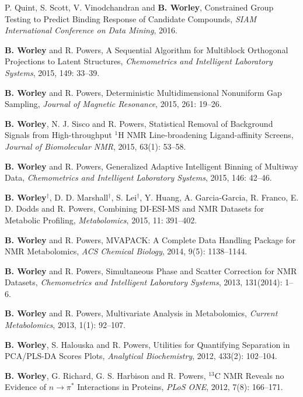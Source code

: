 \documentclass[letterpaper]{article}
\renewenvironment{itemize}{
  \begin{list}{}{
    \setlength{\leftmargin}{1.5em}
  }
}{
  \end{list}
}
\begin{document}
\begin{itemize}
 \item P. Quint, S. Scott, V. Vinodchandran and \textbf{B. Worley},
  Constrained Group Testing to Predict Binding
  Response of Candidate Compounds,
  \emph{SIAM International Conference on Data Mining}, 2016.

 \item \textbf{B. Worley} and R. Powers,
  A Sequential Algorithm for Multiblock Orthogonal Projections
  to Latent Structures,
  \emph{Chemometrics and Intelligent Laboratory Systems},
  2015, 149: 33--39.

 \item \textbf{B. Worley} and R. Powers,
  Deterministic Multidimensional Nonuniform Gap Sampling,
  \emph{Journal of Magnetic Resonance},
  2015, 261: 19--26.

 \item \textbf{B. Worley}, N. J. Sisco and R. Powers,
  Statistical Removal of Background Signals from High-throughput $^1$H NMR
  Line-broadening Ligand-affinity Screens,
  \emph{Journal of Biomolecular NMR},
  2015, 63(1): 53--58.

 \item \textbf{B. Worley} and R. Powers,
  Generalized Adaptive Intelligent Binning of Multiway Data,
  \emph{Chemometrics and Intelligent Laboratory Systems},
  2015, 146: 42--46.

 \item \textbf{B. Worley}$^\dagger$, D. D. Marshall$^\dagger$,
  S. Lei$^\dagger$, Y. Huang, A. Garcia-Garcia, R. Franco,
  E. D. Dodds and R. Powers, Combining DI-ESI-MS and NMR Datasets for
  Metabolic Profiling,
  \emph{Metabolomics},
  2015, 11: 391--402.

 \item \textbf{B. Worley} and R. Powers,
  MVAPACK: A Complete Data Handling Package for NMR Metabolomics,
  \emph{ACS Chemical Biology},
  2014, 9(5): 1138--1144.

 \item \textbf{B. Worley} and R. Powers,
  Simultaneous Phase and Scatter Correction for NMR Datasets,
  \emph{Chemometrics and Intelligent Laboratory Systems},
  2013, 131(2014): 1--6.

 \item \textbf{B. Worley} and R. Powers,
  Multivariate Analysis in Metabolomics,
  \emph{Current Metabolomics},
  2013, 1(1): 92--107.

 \item \textbf{B. Worley}, S. Halouska and R. Powers,
  Utilities for Quantifying Separation in PCA/PLS-DA Scores Plots,
  \emph{Analytical Biochemistry},
  2012, 433(2): 102--104.

 \item \textbf{B. Worley}, G. Richard, G. S. Harbison and R. Powers,
  $^{13}$C NMR Reveals no Evidence of $n\rightarrow\pi^*$ Interactions
  in Proteins, \emph{PLoS ONE},
  2012, 7(8): 166--171.
\end{itemize}
\end{document}
